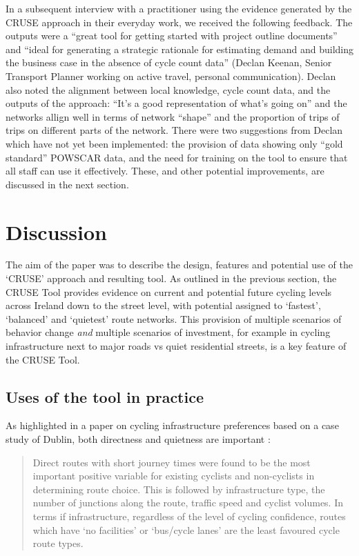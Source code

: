 \documentclass[
  super,
  preprint,
  3p]{elsarticle}
\begin{document}
In a subsequent interview with a practitioner using the evidence
generated by the CRUSE approach in their everyday work, we received the
following feedback. The outputs were a ``great tool for getting started
with project outline documents'' and ``ideal for generating a strategic
rationale for estimating demand and building the business case in the
absence of cycle count data'' (Declan Keenan, Senior Transport Planner
working on active travel, personal communication). Declan also noted the
alignment between local knowledge, cycle count data, and the outputs of
the approach: ``It's a good representation of what's going on'' and the
networks allign well in terms of network ``shape'' and the proportion of
trips of trips on different parts of the network. There were two
suggestions from Declan which have not yet been implemented: the
provision of data showing only ``gold standard'' POWSCAR data, and the
need for training on the tool to ensure that all staff can use it
effectively. These, and other potential improvements, are discussed in
the next section.

\section{Discussion}\label{sec-discussion}

The aim of the paper was to describe the design, features and potential
use of the `CRUSE' approach and resulting tool. As outlined in the
previous section, the CRUSE Tool provides evidence on current and
potential future cycling levels across Ireland down to the street level,
with potential assigned to `fastest', `balanced' and `quietest' route
networks. This provision of multiple scenarios of behavior change
\emph{and} multiple scenarios of investment, for example in cycling
infrastructure next to major roads vs quiet residential streets, is a
key feature of the CRUSE Tool.

\subsection{Uses of the tool in
practice}\label{uses-of-the-tool-in-practice}

As highlighted in a paper on cycling infrastructure preferences based on
a case study of Dublin, both directness and quietness are important
\citep{caulfield2012}:

\begin{quote}
Direct routes with short journey times were found to be the most
important positive variable for existing cyclists and non-cyclists in
determining route choice. This is followed by infrastructure type, the
number of junctions along the route, traffic speed and cyclist volumes.
In terms if infrastructure, regardless of the level of cycling
confidence, routes which have `no facilities' or `bus/cycle lanes' are
the least favoured cycle route types.
\end{quote}
\end{document}
